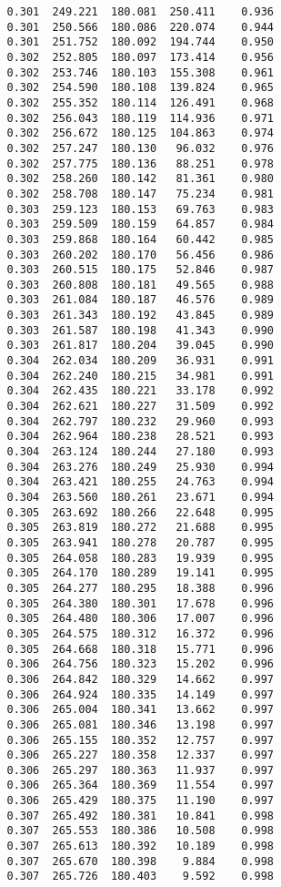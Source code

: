 \begin{verbatim}
   0.301  249.221  180.081  250.411    0.936
   0.301  250.566  180.086  220.074    0.944
   0.301  251.752  180.092  194.744    0.950
   0.302  252.805  180.097  173.414    0.956
   0.302  253.746  180.103  155.308    0.961
   0.302  254.590  180.108  139.824    0.965
   0.302  255.352  180.114  126.491    0.968
   0.302  256.043  180.119  114.936    0.971
   0.302  256.672  180.125  104.863    0.974
   0.302  257.247  180.130   96.032    0.976
   0.302  257.775  180.136   88.251    0.978
   0.302  258.260  180.142   81.361    0.980
   0.302  258.708  180.147   75.234    0.981
   0.303  259.123  180.153   69.763    0.983
   0.303  259.509  180.159   64.857    0.984
   0.303  259.868  180.164   60.442    0.985
   0.303  260.202  180.170   56.456    0.986
   0.303  260.515  180.175   52.846    0.987
   0.303  260.808  180.181   49.565    0.988
   0.303  261.084  180.187   46.576    0.989
   0.303  261.343  180.192   43.845    0.989
   0.303  261.587  180.198   41.343    0.990
   0.303  261.817  180.204   39.045    0.990
   0.304  262.034  180.209   36.931    0.991
   0.304  262.240  180.215   34.981    0.991
   0.304  262.435  180.221   33.178    0.992
   0.304  262.621  180.227   31.509    0.992
   0.304  262.797  180.232   29.960    0.993
   0.304  262.964  180.238   28.521    0.993
   0.304  263.124  180.244   27.180    0.993
   0.304  263.276  180.249   25.930    0.994
   0.304  263.421  180.255   24.763    0.994
   0.304  263.560  180.261   23.671    0.994
   0.305  263.692  180.266   22.648    0.995
   0.305  263.819  180.272   21.688    0.995
   0.305  263.941  180.278   20.787    0.995
   0.305  264.058  180.283   19.939    0.995
   0.305  264.170  180.289   19.141    0.995
   0.305  264.277  180.295   18.388    0.996
   0.305  264.380  180.301   17.678    0.996
   0.305  264.480  180.306   17.007    0.996
   0.305  264.575  180.312   16.372    0.996
   0.305  264.668  180.318   15.771    0.996
   0.306  264.756  180.323   15.202    0.996
   0.306  264.842  180.329   14.662    0.997
   0.306  264.924  180.335   14.149    0.997
   0.306  265.004  180.341   13.662    0.997
   0.306  265.081  180.346   13.198    0.997
   0.306  265.155  180.352   12.757    0.997
   0.306  265.227  180.358   12.337    0.997
   0.306  265.297  180.363   11.937    0.997
   0.306  265.364  180.369   11.554    0.997
   0.306  265.429  180.375   11.190    0.997
   0.307  265.492  180.381   10.841    0.998
   0.307  265.553  180.386   10.508    0.998
   0.307  265.613  180.392   10.189    0.998
   0.307  265.670  180.398    9.884    0.998
   0.307  265.726  180.403    9.592    0.998

\end{verbatim}
